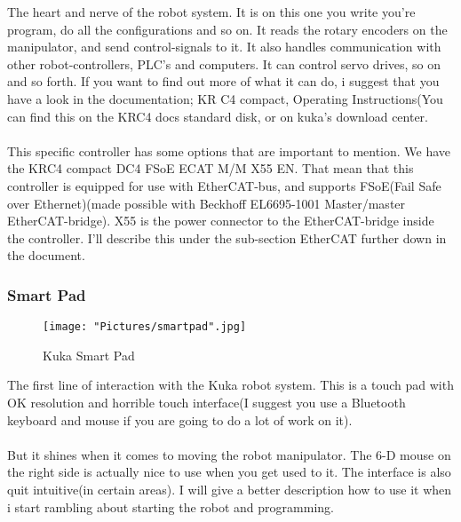 \documentclass{article}
\begin{document}
        The heart and nerve of the robot system. It is on this one you write you're program, do all the configurations and so on. It reads the rotary encoders on the manipulator, and send control-signals to it. It also handles communication with other robot-controllers, PLC's and computers. It can control servo drives, so on and so forth. If you want to find out more of what it can do, i suggest that you have a look in the documentation; KR C4 compact, Operating Instructions(You can find this on the KRC4 docs standard disk, or on kuka's download center.
        \\\\
        This specific controller has some options that are important to mention. We have the KRC4 compact DC4 FSoE ECAT M/M X55 EN. That mean that this controller is equipped for use with EtherCAT-bus, and supports FSoE(Fail Safe over Ethernet)(made possible with Beckhoff EL6695-1001 Master/master EtherCAT-bridge).  X55 is the power connector to the EtherCAT-bridge inside the controller. I'll describe this under the sub-section EtherCAT further down in the document.
        
\newpage

        \subsubsection{Smart Pad}
        
        \begin{figure}[!h]
            \centering
            \texttt{[image: "Pictures/smartpad".jpg]}
            \caption{Kuka Smart Pad}
        \end{figure}
        
        The first line of interaction with the Kuka robot system. This is a touch pad with OK resolution and horrible touch interface(I suggest you use a Bluetooth keyboard and mouse if you are going to do a lot of work on it).
        \\\\
        But it shines when it comes to moving the robot manipulator. The 6-D mouse on the right side is actually nice to use when you get used to it. The interface is also quit intuitive(in certain areas). I will give a better description how to use it when i start rambling about starting the robot and programming.
        
        \newpage
        
\end{document}
